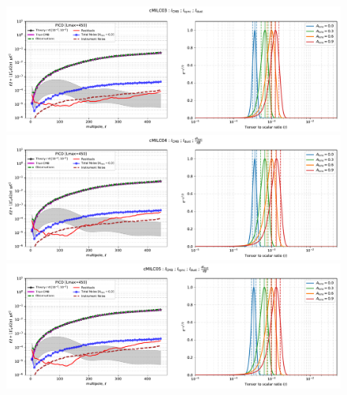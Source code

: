 \documentclass[11pt]{article}
\begin{document}
\begin{figure}
\centering
\includegraphics[width=1.2\textwidth]{ps_and_bbposterir_cMILC03.pdf}
\includegraphics[width=1.2\textwidth]{ps_and_bbposterir_cMILC04.pdf}
\includegraphics[width=1.2\textwidth]{ps_and_bbposterir_cMILC05.pdf}
\end{figure}
\end{document}
